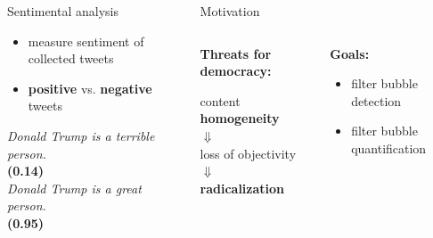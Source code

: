 \documentclass[final]{beamer}
\begin{document}
\begin{frame}[fragile]
\begin{columns}[T]
\begin{column}{.33\textwidth}
\begin{block}{Sentimental analysis}
\begin{itemize}
    \item measure sentiment of collected tweets
    \item \textbf{positive} vs. \textbf{negative} tweets
\end{itemize}
\center
\textit{Donald Trump is a terrible person.}\\
\textbf{(0.14)}\\
\vspace{0.5cm}
\textit{Donald Trump is a great person.}\\
\textbf{(0.95)}
\end{block}

\end{column}
\begin{column}{.63\textwidth}
    \begin{alertblock}{Motivation}
        \begin{columns}
            \begin{column}{.5\textwidth}
                \begin{large}\textbf{Threats for democracy:}\end{large}
                \vspace{0.5cm}
                \center
                content \textbf{homogeneity}\\
                $\Downarrow$\\
                loss of objectivity\\
                $\Downarrow$\\
                \textbf{radicalization}
            \end{column}
            \begin{column}{.5\textwidth}
                \begin{large}\textbf{Goals:}\end{large}
                \vspace{0.5cm}
                \begin{itemize}
                    \item filter bubble detection
                    \item filter bubble quantification
                \end{itemize}
            \end{column}
        \end{columns}
    \end{alertblock}
\end{column}
\end{columns}









\end{frame}
\end{document}
